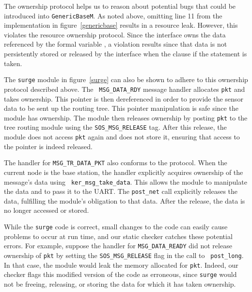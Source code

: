 The ownership protocol helps us to reason about potential bugs that
could be introduced into {\tt GenericBaseM}.  As noted above, omitting
line 11 from the implementation in figure~\ref{genericbase} results in
a resource leak.  However, this violates the resource ownership
protocol.  Since the  interface owns the data referenced
by the formal variable , a violation results since that
data is not persistently stored or released by the interface when the
 clause if the  statement is taken.

\smallskip{}


The {\tt surge} module in figure~\ref{surge} can also be shown to
adhere to this ownership protocol described above.  The {\tt
MSG\_DATA\_RDY} message handler allocates {\tt pkt} and takes
ownership. This pointer is then dereferenced in order to provide the
sensor data to be sent up the routing tree.  This pointer manipulation
is safe since the module has ownership.  The module then releases
ownership by posting {\tt pkt} to the tree routing module using the
{\tt SOS\_MSG\_RELEASE} tag.  After this release, the module does not
access {\tt pkt} again and does not store it, ensuring that access to
the pointer is indeed released. 

The handler for {\tt MSG\_TR\_DATA\_PKT} also conforms to the
protocol.   When the current node is the base station, the handler
explicitly acquires ownership of the message's data using {\tt
ker\_msg\_take\_data}.  This allows the module to manipulate the data
and to pass it to the UART.  The {\tt post\_net} call explicitly
releases the data, fulfilling the module's obligation to that data.
After the release, the data is no longer accessed or stored.

While the {\tt surge} code is correct, small changes to the code can
easily cause problems to occur at run time, and our static checker
catches these potential errors.  For example, suppose the handler for
{\tt MSG\_DATA\_READY} did not release ownership of {\tt pkt} by
setting the {\tt SOS\_MSG\_RELEASE} flag in the call to {\tt
post\_long}.  In that case, the module would leak the memory allocated
for {\tt pkt}.  Indeed, our checker flags this modified version of the
code as erroneous, since {\tt surge} would not be freeing, releasing,
or storing the data for which it has taken ownership.




